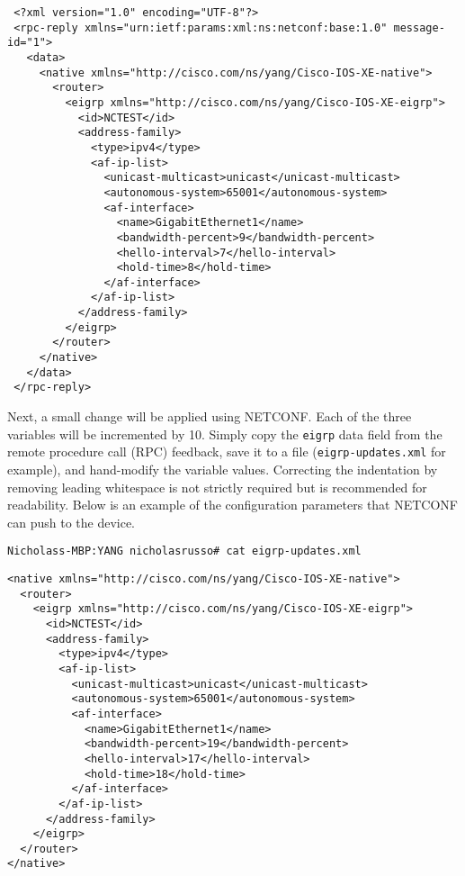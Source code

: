 \begin{verbatim}
 <?xml version="1.0" encoding="UTF-8"?>
 <rpc-reply xmlns="urn:ietf:params:xml:ns:netconf:base:1.0" message-id="1">
   <data>
     <native xmlns="http://cisco.com/ns/yang/Cisco-IOS-XE-native">
       <router>
         <eigrp xmlns="http://cisco.com/ns/yang/Cisco-IOS-XE-eigrp">
           <id>NCTEST</id>
           <address-family>
             <type>ipv4</type>
             <af-ip-list>
               <unicast-multicast>unicast</unicast-multicast>
               <autonomous-system>65001</autonomous-system>
               <af-interface>
                 <name>GigabitEthernet1</name>
                 <bandwidth-percent>9</bandwidth-percent>
                 <hello-interval>7</hello-interval>
                 <hold-time>8</hold-time>
               </af-interface>
             </af-ip-list>
           </address-family>
         </eigrp>
       </router>
     </native>
   </data>
 </rpc-reply>
\end{verbatim}

Next, a small change will be applied using NETCONF\@. Each of the three
variables will be incremented by 10. Simply copy the \verb|eigrp| data field from
the remote procedure call (RPC) feedback, save it to a file
(\verb|eigrp-updates.xml| for example), and hand-modify the variable values.
Correcting the indentation by removing leading whitespace is not strictly
required but is recommended for readability. Below is an example of the
configuration parameters that NETCONF can push to the device.

\begin{verbatim}
Nicholass-MBP:YANG nicholasrusso# cat eigrp-updates.xml
\end{verbatim}

\begin{verbatim}
<native xmlns="http://cisco.com/ns/yang/Cisco-IOS-XE-native">
  <router>
    <eigrp xmlns="http://cisco.com/ns/yang/Cisco-IOS-XE-eigrp">
      <id>NCTEST</id>
      <address-family>
        <type>ipv4</type>
        <af-ip-list>
          <unicast-multicast>unicast</unicast-multicast>
          <autonomous-system>65001</autonomous-system>
          <af-interface>
            <name>GigabitEthernet1</name>
            <bandwidth-percent>19</bandwidth-percent>
            <hello-interval>17</hello-interval>
            <hold-time>18</hold-time>
          </af-interface>
        </af-ip-list>
      </address-family>
    </eigrp>
  </router>
</native>
\end{verbatim}

